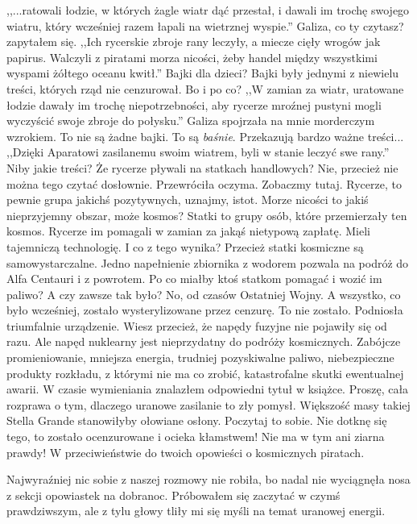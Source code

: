 \begin{dialogue}
	\ds{} ,,...ratowali łodzie, w których żagle wiatr dąć przestał, i dawali im trochę swojego wiatru, który wcześniej razem łapali na wietrznej wyspie.''
	\ds{} Galiza, co ty czytasz? \dm{} zapytałem się.
	\ds{} ,,Ich rycerskie zbroje rany leczyły, a miecze cięły wrogów jak papirus. Walczyli z piratami morza nicości, żeby handel między wszystkimi wyspami żółtego oceanu kwitł.''
	\ds{} Bajki dla dzieci? \dm{} Bajki były jednymi z niewielu treści, których rząd nie cenzurował. Bo i po co?
	\ds{} ,,W zamian za wiatr, uratowane łodzie dawały im trochę niepotrzebności, aby rycerze mroźnej pustyni mogli wyczyścić swoje zbroje do połysku.'' \dm{} Galiza spojrzała na mnie morderczym wzrokiem. \dm{} To nie są żadne bajki. To są \emph{baśnie}. Przekazują bardzo ważne treści... ,,Dzięki Aparatowi zasilanemu swoim wiatrem, byli w stanie leczyć swe rany.''
	\ds{} Niby jakie treści? Że rycerze pływali na statkach handlowych?
	\ds{} Nie, przecież nie można tego czytać dosłownie. \dm{} Przewróciła oczyma. \dm{} Zobaczmy tutaj. Rycerze, to pewnie grupa jakichś pozytywnych, uznajmy, istot. Morze nicości to jakiś nieprzyjemny obszar, może kosmos? Statki to grupy osób, które przemierzały ten kosmos. Rycerze im pomagali w zamian za jakąś nietypową zapłatę. Mieli tajemniczą technologię.
	\ds{} I co z tego wynika? Przecież statki kosmiczne są samowystarczalne. Jedno napełnienie zbiornika z wodorem pozwala na podróż do Alfa Centauri i z powrotem. Po co miałby ktoś statkom pomagać i wozić im paliwo?
	\ds{} A czy zawsze tak było?
	\ds{} No, od czasów Ostatniej Wojny. A wszystko, co było wcześniej, zostało wysterylizowane przez cenzurę.
	\ds{} To nie zostało. \dm{} Podniosła triumfalnie urządzenie. \dm{} Wiesz przecież, że napędy fuzyjne nie pojawiły się od razu.
	\ds{} Ale napęd nuklearny jest nieprzydatny do podróży kosmicznych. Zabójcze promieniowanie, mniejsza energia, trudniej pozyskiwalne paliwo, niebezpieczne produkty rozkładu, z którymi nie ma co zrobić, katastrofalne skutki ewentualnej awarii. \dm{} W czasie wymieniania znalazłem odpowiedni tytuł w książce. \dm{} Proszę, cała rozprawa o tym, dlaczego uranowe zasilanie to zły pomysł. Większość masy takiej Stella Grande stanowiłyby ołowiane osłony. Poczytaj to sobie.
	\ds{} Nie dotknę się tego, to zostało ocenzurowane i ocieka kłamstwem! Nie ma w tym ani ziarna prawdy!
	\ds{} W przeciwieństwie do twoich opowieści o kosmicznych piratach.
\end{dialogue}

Najwyraźniej nic sobie z naszej rozmowy nie robiła, bo nadal nie wyciągnęła nosa z sekcji opowiastek na dobranoc.
Próbowałem się zaczytać w czymś prawdziwszym, ale z tylu głowy tliły mi się myśli na temat uranowej energii.

